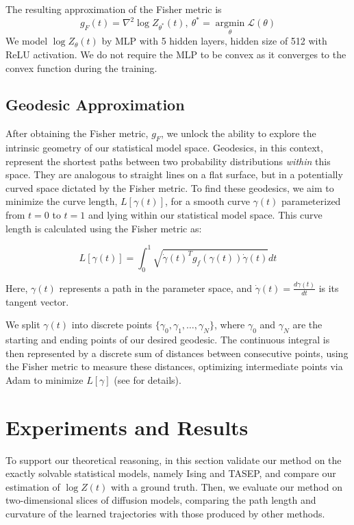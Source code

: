 \documentclass{article}
\theoremstyle{plain}
\theoremstyle{definition}
\theoremstyle{remark}
\begin{document}
The resulting approximation of the Fisher metric is
\begin{equation}
        g_{F}(t) = \nabla^{2} \log Z_{\theta^{*}}(t), \ \theta^{*} = \operatorname*{argmin}_{\theta} \mathcal{L}(\theta)
\end{equation}
We model $\log Z_{\theta}(t)$ by MLP with 5 hidden layers, hidden size of 512 with ReLU activation. We do not require the MLP to be convex as it converges to the convex function during the training.

\subsection{Geodesic Approximation}
After obtaining the Fisher metric, $g_F$, we unlock the ability to explore the intrinsic geometry of our statistical model space. Geodesics, in this context, represent the shortest paths between two probability distributions \emph{within} this space. %
They are analogous to straight lines on a flat surface, but in a potentially curved space dictated by the Fisher metric. 
To find these geodesics, we aim to minimize the curve length, $L[\gamma(t)]$, for a smooth curve $\gamma(t)$ parameterized from $t=0$ to $t=1$ and lying within our statistical model space.  This curve length is calculated using the Fisher metric as:

\begin{equation}
    L[\gamma(t)] = \int_{0}^{1} \sqrt{\dot{\gamma}(t)^{T}g_{f}(\gamma(t))\dot{\gamma}(t)}dt
\end{equation}

Here, $\gamma(t)$ represents a path in the parameter space, and $\dot{\gamma}(t) = \frac{d\gamma(t)}{dt}$ is its tangent vector. 

We split $\gamma(t)$ into discrete points $\{\gamma_0, \gamma_1, \ldots, \gamma_N\}$, where $\gamma_0$ and $\gamma_N$ are the starting and ending points of our desired geodesic. The continuous integral is then represented by a discrete sum of distances between consecutive points, using the Fisher metric to measure these distances, optimizing intermediate points via Adam to minimize $L[\gamma]$ (see \cite{shao2018riemannian} for details).


\section{Experiments and Results}

To support our theoretical reasoning, in this section validate our method on the exactly solvable statistical models, namely Ising and TASEP, and compare our estimation of $\log Z(t)$ with a ground truth.
Then, we evaluate our method on two-dimensional slices of diffusion models, comparing the path length and curvature of the learned trajectories with those produced by other methods.
\end{document}
